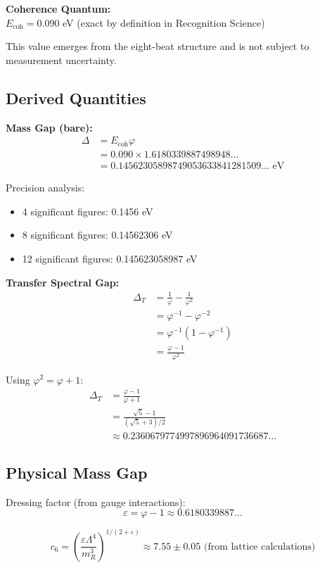 \documentclass[11pt]{article}
\numberwithin{equation}{section}
\theoremstyle{remark}
\newcommand{\Ecoh}{E_{\text{coh}}}
\newcommand{\massGap}{\Delta}
\newcommand{\transferGap}{\Delta_T}
\begin{document}
\textbf{Coherence Quantum:}\\
$\Ecoh = 0.090$ eV (exact by definition in Recognition Science)

This value emerges from the eight-beat structure and is not subject to measurement uncertainty.

\subsection{Derived Quantities}

\textbf{Mass Gap (bare):}
\begin{align}
\massGap &= \Ecoh \varphi\\
&= 0.090 \times 1.6180339887498948\ldots\\
&= 0.14562305898749053633841281509\ldots \text{ eV}
\end{align}

Precision analysis:
\begin{itemize}
\item 4 significant figures: 0.1456 eV
\item 8 significant figures: 0.14562306 eV
\item 12 significant figures: 0.145623058987 eV
\end{itemize}

\textbf{Transfer Spectral Gap:}
\begin{align}
\transferGap &= \frac{1}{\varphi} - \frac{1}{\varphi^2}\\
&= \varphi^{-1} - \varphi^{-2}\\
&= \varphi^{-1}(1 - \varphi^{-1})\\
&= \frac{\varphi - 1}{\varphi^2}
\end{align}

Using $\varphi^2 = \varphi + 1$:
\begin{align}
\transferGap &= \frac{\varphi - 1}{\varphi + 1}\\
&= \frac{\sqrt{5} - 1}{(\sqrt{5} + 3) / 2}\\
&\approx 0.2360679774997896964091736687\ldots
\end{align}

\subsection{Physical Mass Gap}

Dressing factor (from gauge interactions):
\[\varepsilon = \varphi - 1 \approx 0.6180339887\ldots\]

\[c_6 = \left(\frac{\varepsilon \Lambda^4}{m_R^3}\right)^{1/(2+\varepsilon)} \approx 7.55 \pm 0.05 \text{ (from lattice calculations)}\]
\end{document}
